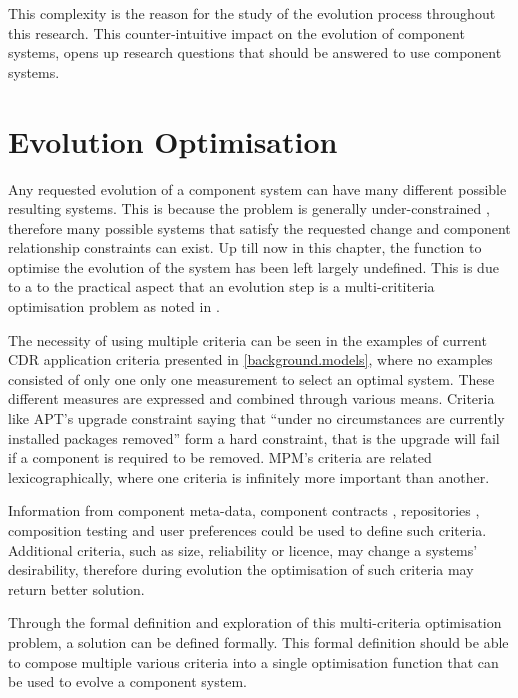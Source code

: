 This complexity is the reason for the study of the evolution process throughout this research. 
This counter-intuitive impact on the evolution of component systems, opens up research questions that should be answered to use component systems.

\section{Evolution Optimisation}
\label{formal.opt}
Any requested evolution of a component system can have many different possible resulting systems.
This is because the problem is generally under-constrained \cite{leberre2008}, therefore many possible systems that satisfy the requested change and component relationship constraints can exist.
Up till now in this chapter, the function to optimise the evolution of the system has been left largely undefined.
This is due to a to the practical aspect that an evolution step is a multi-crititeria optimisation problem as noted in \cite{leBerre2010}. 

The necessity of using multiple criteria can be seen in the examples of current CDR application criteria presented in \ref{background.models},
where no examples consisted of only one only one measurement to select an optimal system.
These different measures are expressed and combined through various means.
Criteria like APT's upgrade constraint saying that ``under no circumstances are currently installed packages removed'' form a hard constraint,
that is the upgrade will fail if a component is required to be removed.
MPM's criteria are related lexicographically, where one criteria is infinitely more important than another.

Information from component meta-data, component contracts \cite{Watkins1999}, repositories \cite{Guo2000}, 
composition testing \cite{XuejieZhang2008} and user preferences could be used to define such criteria.
Additional criteria, such as size, reliability or licence, may change a systems' desirability, 
therefore during evolution the optimisation of such criteria may return better solution.

Through the formal definition and exploration of this multi-criteria optimisation problem,
a solution can be defined formally.
This formal definition should be able to compose multiple various criteria into a single optimisation function that can be used to evolve a component system.

